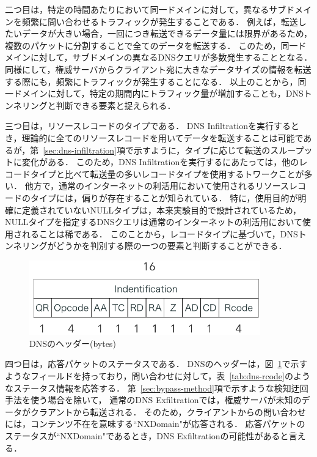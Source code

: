 二つ目は，特定の時間あたりにおいて同一ドメインに対して，異なるサブドメインを頻繁に問い合わせるトラフィックが発生することである．
例えば，転送したいデータが大きい場合，一回につき転送できるデータ量には限界があるため，複数のパケットに分割することで全てのデータを転送する．
このため，同一ドメインに対して，サブドメインの異なるDNSクエリが多数発生することとなる．
同様にして，権威サーバからクライアント宛に大きなデータサイズの情報を転送する際にも，頻繁にトラフィックが発生することになる．
以上のことから，同一ドメインに対して，特定の期間内にトラフィック量が増加することも，DNSトンネリングと判断できる要素と捉えられる．

三つ目は，リソースレコードのタイプである．
DNS Infiltrationを実行するとき，理論的に全てのリソースレコードを用いてデータを転送することは可能であるが，第~\ref{sec:dns-infiltration}項で示すように，タイプに応じて転送のスループットに変化がある．
このため，DNS Infiltrationを実行するにあたっては，他のレコードタイプと比べて転送量の多いレコードタイプを使用するトワークことが多い．
他方で，通常のインターネットの利活用において使用されるリソースレコードのタイプには，偏りが存在することが知られている．
特に，使用目的が明確に定義されていないNULLタイプは，本来実験目的で設計されているため，NULLタイプを指定するDNSクエリは通常のインターネットの利活用において使用されることは稀である．
このことから，レコードタイプに基づいて，DNSトンネリングがどうかを判別する際の一つの要素と判断することができる．

%
%

\begin{figure}[h]
 \centering
 \includegraphics[width=10.0cm]{figure/dns-header.png}
 \caption{DNSのヘッダー(bytes)}
 \label{fig:dns-header}
\end{figure}



四つ目は，応答パケットのステータスである．
DNSのヘッダーは，図~\ref{fig:dns-header}で示すようなフィールドを持っており，問い合わせに対して，表~\ref{tab:dns-rcode}のようなステータス情報を応答する．
第~\ref{sec:bypass-method}項で示すような検知迂回手法を使う場合を除いて，
通常のDNS Exfiltrationでは，権威サーバが未知のデータがクラアントから転送される．
そのため，クライアントからの問い合わせには，コンテンツ不在を意味する``NXDomain"が応答される．
応答パケットのステータスが``NXDomain"であるとき，DNS Exfiltrationの可能性があると言える．


